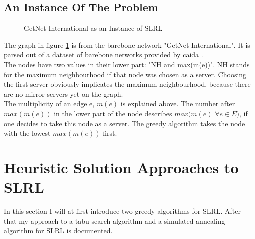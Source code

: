 \documentclass [12pt]{article}
\begin{document}
\subsection{An Instance Of The Problem}
\begin{figure}[H]
  \centering
  \caption{GetNet International as an Instance of SLRL}
  \label{instancelol}
\end{figure}
The graph in figure \ref{instancelol} is from the barebone network "GetNet International".
It is parsed out of a dataset of barebone networks provided by caida \cite{caidabarebones}.
\\
The nodes have two values in their lower part: "NH and max(m(e))". NH stands for 
the maximum neighbourhood if that node was chosen as a server. Choosing the first
server obviously implicates the maximum neighbourhood, because there are
no mirror servers yet on the graph.\\
The multiplicity of an edge e, $m(e)$ is explained above. The number after
$max(m(e))$ in the lower part of the node describes $max(m(e)$ $ \forall e \in E)$,
if one decides to take this node as a server.
The greedy algorithm takes the node with the lowest $max(m(e))$ first.

\section{Heuristic Solution Approaches to SLRL}
In this section I will at first introduce two greedy algorithms for SLRL. After that my approach to a tabu search algorithm and a simulated annealing algorithm for SLRL is documented. 
\end{document}
